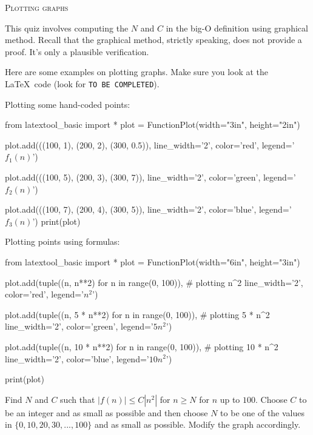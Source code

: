 

\LATEXHELPTHREEFIVEZERO

\newpage
\textsc{Plotting graphs}

This quiz involves computing the $N$ and $C$ in the big-O definition
using graphical method.
Recall that the graphical method, strictly speaking,
does not provide a proof.
It's only a plausible verification.

Here are some examples on plotting graphs.
Make sure you look at the \LaTeX\ code
(look for \texttt{TO BE COMPLETED}).

Plotting some hand-coded points:
\begin{python}
from latextool_basic import *
plot = FunctionPlot(width="3in", height="2in")

plot.add(((100, 1),
          (200, 2),
          (300, 0.5)),
         line_width='2', color='red', legend='$f_1(n)$')

plot.add(((100, 5),
          (200, 3),
          (300, 7)),
          line_width='2', color='green', legend='$f_2(n)$')

plot.add(((100, 7),
          (200, 4),
          (300, 5)),
          line_width='2', color='blue', legend='$f_3(n)$')
print(plot)
\end{python}

Plotting points using formulas:
\begin{python}
from latextool_basic import *
plot = FunctionPlot(width="6in", height="3in")

plot.add(tuple((n, n**2) for n in range(0, 100)),        # plotting n^2
         line_width='2', color='red', legend='$n^2$')

plot.add(tuple((n, 5 * n**2) for n in range(0, 100)),    # plotting 5 * n^2
         line_width='2', color='green', legend='$5 n^2$')

plot.add(tuple((n, 10 * n**2) for n in range(0, 100)),   # plotting 10 * n^2
         line_width='2', color='blue', legend='$10 n^2$')

print(plot)
\end{python}

\TURNPAGE
\newpage

\nextq
Find $N$ and $C$ such that $|f(n)| \leq C |n^2|$ for $n \geq N$
for $n$ up to $100$.
Choose $C$ to be an integer and as small as possible and then choose
$N$ to be one of the values in $\{0, 10, 20, 30, ..., 100\}$ and as small as
possible.
Modify the graph accordingly.

